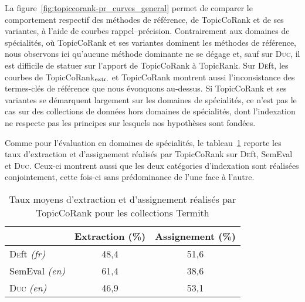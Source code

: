         La figure~\ref{fig:topiccorank-pr_curves_general} permet de comparer le
        comportement respectif des méthodes de référence, de TopicCoRank et de
        ses variantes, à l'aide de courbes rappel--précision. Contrairement aux
        domaines de spécialités, où TopicCoRank et ses variantes dominent les
        méthodes de référence, nous observons ici qu'aucune méthode dominante
        ne se dégage et, sauf sur \textsc{Duc}, il est difficile de statuer sur
        l'apport de TopicCoRank à TopicRank. Sur \textsc{De}ft, les courbes de
        TopicCoRank$_\textnormal{extr.}$ et TopicCoRank montrent aussi
        l'inconsistance des termes-clés de référence que nous évonquons
        au-dessus. Si TopicCoRank et ses variantes se démarquent largement sur
        les domaines de spécialités, ce n'est pas le cas sur des collections de
        données hors domaines de spécialités, dont l'indexation ne respecte pas
        les principes sur lesquels nos hypothèses sont fondées.
        

        Comme pour l'évaluation en domaines de spécialités, le
        tableau~\ref{tab:assignment_ratio_general} reporte les taux d'extraction
        et d'assignement réalisés par TopicCoRank sur \textsc{De}ft, SemEval et
        \textsc{Duc}. Ceux-ci montrent aussi que les deux catégories
        d'indexation sont réalisées conjointement, cette fois-ci sans
        prédominance de l'une face à l'autre.
        \begin{table}[h]
          \centering
          \begin{tabular}{l|c|c}
              \toprule
              & Extraction (\%) & Assignement (\%)\\
              \hline
              \textsc{De}ft \textit{(fr)} & 48,4 & 51,6\\
              SemEval \textit{(en)} & 61,4 & 38,6\\
              \textsc{Duc} \textit{(en)} & 46,9 & 53,1\\
              \bottomrule
          \end{tabular}
          \caption{Taux moyens d'extraction et d'assignement réalisés par
                   TopicCoRank pour les collections Termith
                   \label{tab:assignment_ratio_general}}
        \end{table}

